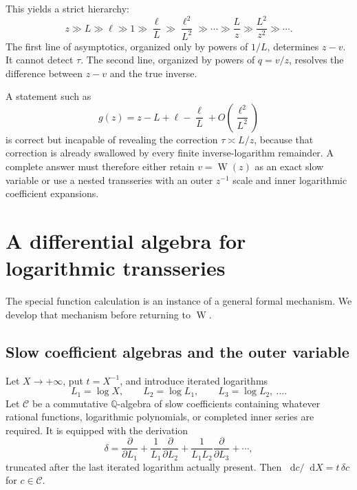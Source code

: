 \documentclass[11pt,oneside]{article}
\theoremstyle{plain}
\theoremstyle{definition}
\theoremstyle{remark}
\newcommand{\W}{\operatorname{W}}
\newcommand{\dd}{\mathop{}\!\mathrm{d}}
\newcommand{\Q}{\mathbb{Q}}
\newcommand{\Ccal}{\mathcal{C}}
\begin{document}
This yields a strict hierarchy:
\[
 z\gg L\gg\ell\gg1\gg \frac{\ell}{L}\gg\frac{\ell^2}{L^2}
 \gg\cdots\gg\frac{L}{z}\gg\frac{L^2}{z^2}\gg\cdots.
\]
The first line of asymptotics, organized only by powers of \(1/L\), determines
\(z-v\).  It cannot detect \(\tau\).  The second line, organized by powers of
\(q=v/z\), resolves the difference between \(z-v\) and the true inverse.

\begin{warningbox}
A statement such as
\[
 g(z)=z-L+\ell-\frac{\ell}{L}+O\!\left(\frac{\ell^2}{L^2}\right)
\]
is correct but incapable of revealing the correction \(\tau\asymp L/z\),
because that correction is already swallowed by every finite inverse-logarithm
remainder.  A complete answer must therefore either retain \(v=\W(z)\) as an
exact slow variable or use a nested transseries with an outer \(z^{-1}\) scale
and inner logarithmic coefficient expansions.
\end{warningbox}

\section{A differential algebra for logarithmic transseries}
\label{sec:formal-algebra}

The special function calculation is an instance of a general formal mechanism.
We develop that mechanism before returning to \(\W\).

\subsection{Slow coefficient algebras and the outer variable}

Let \(X\to+\infty\), put \(t=X^{-1}\), and introduce iterated logarithms
\begin{equation}
 L_1=\log X,
 \qquad L_2=\log L_1,
 \qquad L_3=\log L_2,\ \ldots .
 \label{eq:iterated-logs}
\end{equation}
Let \(\Ccal\) be a commutative \(\Q\)-algebra of slow coefficients containing
whatever rational functions, logarithmic polynomials, or completed inner
series are required.  It is equipped with the derivation
\begin{equation}
 \delta
 =\frac{\partial}{\partial L_1}
 +\frac{1}{L_1}\frac{\partial}{\partial L_2}
 +\frac{1}{L_1L_2}\frac{\partial}{\partial L_3}+\cdots,
 \label{eq:slow-derivation}
\end{equation}
truncated after the last iterated logarithm actually present.  Then
\(\dd c/\dd X=t\,\delta c\) for \(c\in\Ccal\).
\end{document}
